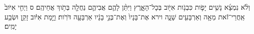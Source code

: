\documentclass{openreader}
\begin{document}
וְלֹ֨א נִמְצָ֜א נָשִׁ֥ים יָפֹ֛ות כִּבְנֹ֥ות אִיֹּ֖וב בְּכָל־הָאָ֑רֶץ וַיִּתֵּ֨ן לָהֶ֧ם אֲבִיהֶ֛ם נַחֲלָ֖ה בְּתֹ֥וךְ אֲחֵיהֶֽם׃ ס 
וַיְחִ֤י אִיֹּוב֙ אַֽחֲרֵי־זֹ֔את מֵאָ֥ה וְאַרְבָּעִ֖ים שָׁנָ֑ה וירא אֶת־בָּנָיו֙ וְאֶת־בְּנֵ֣י בָנָ֔יו אַרְבָּעָ֖ה דֹּרֹֽות׃ 
וַיָּ֣מָת אִיֹּ֔וב זָקֵ֖ן וּשְׂבַ֥ע יָמִֽים׃ 
\end{document}
